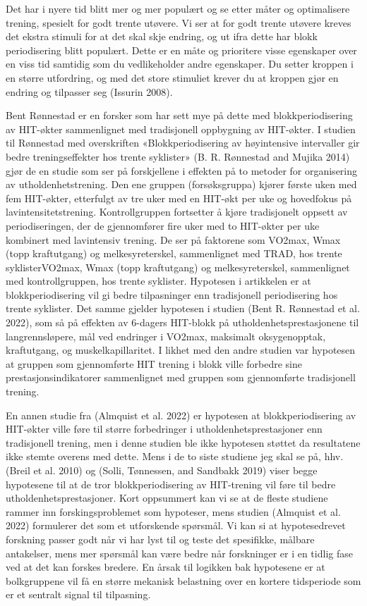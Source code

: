 \documentclass[
  letterpaper,
  DIV=11,
  numbers=noendperiod]{scrreprt}
\begin{document}
Det har i nyere tid blitt mer og mer populært og se etter måter og
optimalisere trening, spesielt for godt trente utøvere. Vi ser at for
godt trente utøvere kreves det ekstra stimuli for at det skal skje
endring, og ut ifra dette har blokk periodisering blitt populært. Dette
er en måte og prioritere visse egenskaper over en viss tid samtidig som
du vedlikeholder andre egenskaper. Du setter kroppen i en større
utfordring, og med det store stimuliet krever du at kroppen gjør en
endring og tilpasser seg (Issurin 2008).

Bent Rønnestad er en forsker som har sett mye på dette med
blokkperiodisering av HIT-økter sammenlignet med tradisjonell oppbygning
av HIT-økter. I studien til Rønnestad med overskriften
«Blokkperiodisering av høyintensive intervaller gir bedre
treningseffekter hos trente syklister» (B. R. Rønnestad and Mujika 2014)
gjør de en studie som ser på forskjellene i effekten på to metoder for
organisering av utholdenhetstrening. Den ene gruppen (forsøksgruppa)
kjører første uken med fem HIT-økter, etterfulgt av tre uker med en
HIT-økt per uke og hovedfokus på lavintensitetstrening. Kontrollgruppen
fortsetter å kjøre tradisjonelt oppsett av periodiseringen, der de
gjennomfører fire uker med to HIT-økter per uke kombinert med
lavintensiv trening. De ser på faktorene som VO2max, Wmax (topp
kraftutgang) og melkesyreterskel, sammenlignet med TRAD, hos trente
syklisterVO2max, Wmax (topp kraftutgang) og melkesyreterskel,
sammenlignet med kontrollgruppen, hos trente syklister. Hypotesen i
artikkelen er at blokkperiodisering vil gi bedre tilpasninger enn
tradisjonell periodisering hos trente syklister. Det samme gjelder
hypotesen i studien (Bent R. Rønnestad et al. 2022), som så på effekten
av 6-dagers HIT-blokk på utholdenhetsprestasjonene til langrennsløpere,
mål ved endringer i VO2max, maksimalt oksygenopptak, kraftutgang, og
muskelkapillaritet. I likhet med den andre studien var hypotesen at
gruppen som gjennomførte HIT trening i blokk ville forbedre sine
prestasjonsindikatorer sammenlignet med gruppen som gjennomførte
tradisjonell trening.

En annen studie fra (Almquist et al. 2022) er hypotesen at
blokkperiodisering av HIT-økter ville føre til større forbedringer i
utholdenhetsprestasjoner enn tradisjonell trening, men i denne studien
ble ikke hypotesen støttet da resultatene ikke stemte overens med dette.
Mens i de to siste studiene jeg skal se på, hhv. (Breil et al. 2010) og
(Solli, Tønnessen, and Sandbakk 2019) viser begge hypotesene til at de
tror blokkperiodisering av HIT-trening vil føre til bedre
utholdenhetsprestasjoner. Kort oppsummert kan vi se at de fleste
studiene rammer inn forskingsproblemet som hypoteser, mens studien
(Almquist et al. 2022) formulerer det som et utforskende spørsmål. Vi
kan si at hypotesedrevet forskning passer godt når vi har lyst til og
teste det spesifikke, målbare antakelser, mens mer spørsmål kan være
bedre når forskninger er i en tidlig fase ved at det kan forskes
bredere. En årsak til logikken bak hypotesene er at bolkgruppene vil få
en større mekanisk belastning over en kortere tidsperiode som er et
sentralt signal til tilpasning.
\end{document}
